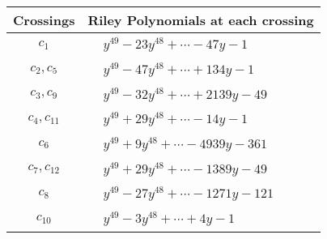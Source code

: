 \documentclass[1p]{elsarticle_modified}
\theoremstyle{definition}
\begin{document}
\begin{tabular}{m{50pt}|m{274pt}}
Crossings & \hspace{64pt}Riley Polynomials at each crossing \\
\hline $$\begin{aligned}c_{1}\end{aligned}$$&$\begin{aligned}
&y^{49}-23 y^{48}+\cdots-47 y-1
\end{aligned}$\\
\hline $$\begin{aligned}c_{2},c_{5}\end{aligned}$$&$\begin{aligned}
&y^{49}-47 y^{48}+\cdots+134 y-1
\end{aligned}$\\
\hline $$\begin{aligned}c_{3},c_{9}\end{aligned}$$&$\begin{aligned}
&y^{49}-32 y^{48}+\cdots+2139 y-49
\end{aligned}$\\
\hline $$\begin{aligned}c_{4},c_{11}\end{aligned}$$&$\begin{aligned}
&y^{49}+29 y^{48}+\cdots-14 y-1
\end{aligned}$\\
\hline $$\begin{aligned}c_{6}\end{aligned}$$&$\begin{aligned}
&y^{49}+9 y^{48}+\cdots-4939 y-361
\end{aligned}$\\
\hline $$\begin{aligned}c_{7},c_{12}\end{aligned}$$&$\begin{aligned}
&y^{49}+29 y^{48}+\cdots-1389 y-49
\end{aligned}$\\
\hline $$\begin{aligned}c_{8}\end{aligned}$$&$\begin{aligned}
&y^{49}-27 y^{48}+\cdots-1271 y-121
\end{aligned}$\\
\hline $$\begin{aligned}c_{10}\end{aligned}$$&$\begin{aligned}
&y^{49}-3 y^{48}+\cdots+4 y-1
\end{aligned}$\\
\hline
\end{tabular}\\~\\
\end{document}
